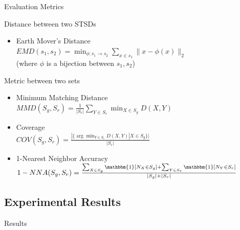 \begin{frame}{Evaluation Metrics}
    \begin{block}{Distance between two STSDs}
        \begin{itemize}
            \item Earth Mover's Distance\\
            $EMD(s_1, s_2) = \min_{\phi: s_1\to s_2} \sum_{x\in s_1} \|x-\phi(x)\|_2$\\
            (where $\phi$ is a bijection between $s_1, s_2$)
        \end{itemize}
    \end{block}
    \begin{block}{Metric between two sets}
        \begin{itemize}
            \item Minimum Matching Distance\\
            $MMD(S_g, S_r) = \frac{1}{|S_r|}\sum_{Y\in S_r} \min_{X\in S_g}D(X,Y)$
            \item Coverage\\
            $COV(S_g, S_r) = \frac{|\{\arg\min_{Y \in S_r} D(X,Y) | X \in S_g \}|}{|S_r|}$
            \item 1-Nearest Neighbor Accuracy\\
            $1-NNA(S_g, S_r) = \frac{\sum_{X\in S_g} \mathbbm{1}[N_X \in S_g] +  \sum_{Y\in S_r} \mathbbm{1}[N_Y \in S_r]}{|S_g|+|S_r|}$
        \end{itemize}
    \end{block}
\end{frame}
\subsection{Experimental Results}
\begin{frame}{Results}
    
\end{frame}